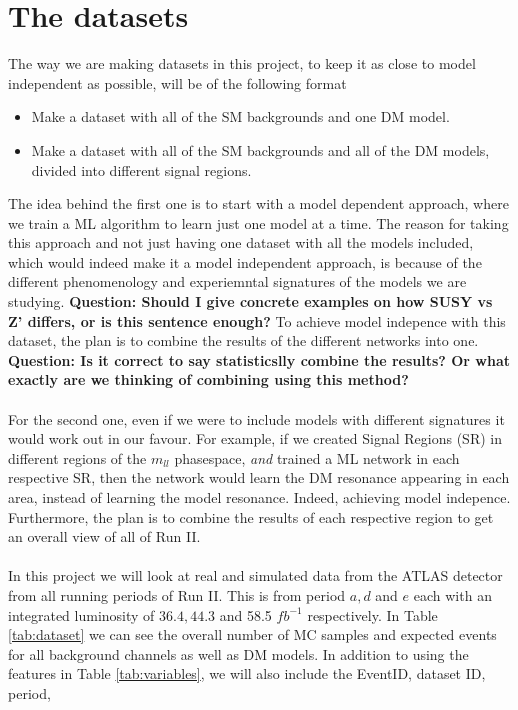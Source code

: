 \documentclass[14pt, a4paper]{book}
\begin{document}
\section{The datasets}
The way we are making datasets in this project, to keep it as close to model independent as possible, will be of the following format
\begin{itemize}
   \item Make a dataset with all of the SM backgrounds and one DM model.
   \item Make a dataset with all of the SM backgrounds and all of the DM models, divided into different signal regions.
\end{itemize}
The idea behind the first one is to start with a model dependent approach, where we train a ML algorithm to learn just one model at a time. The reason for taking this approach and not just having one dataset with all the models included, which would indeed make it 
a model independent approach, is because of the different phenomenology and experiemntal signatures of the models we are studying. \textbf{Question: Should I give concrete examples on how SUSY vs Z' differs, or is this sentence enough?} To achieve model indepence 
with this dataset, the plan is to combine the results of the different networks into one. \textbf{Question: Is it correct to say statisticslly combine the results? Or what exactly are we thinking of combining using this method?} \\
\\For the second one, even if we were to include models with different signatures it would work out in our favour. For example, if we created Signal Regions (SR) in different regions of the $m_{ll}$ phasespace, \textit{and} trained a ML network in each respective SR, 
then the network would learn the DM resonance appearing in each area, instead of learning the model resonance. Indeed, achieving model indepence. Furthermore, the plan is to combine the results of each respective region to get an overall view of all of Run II.\\
\\In this project we will look at real and simulated data from the ATLAS detector from all running periods of Run II. This is from period $a, d$ and $e$ each with an integrated luminosity of $36.4, 44.3$ and 58.5 $fb^{-1}$ respectively. 
In Table \ref{tab:dataset} we can see the overall number of MC samples and expected events for all background channels as well as DM models. In addition to using the features in Table \ref{tab:variables}, we will also include the EventID, dataset ID, period, 
\end{document}
